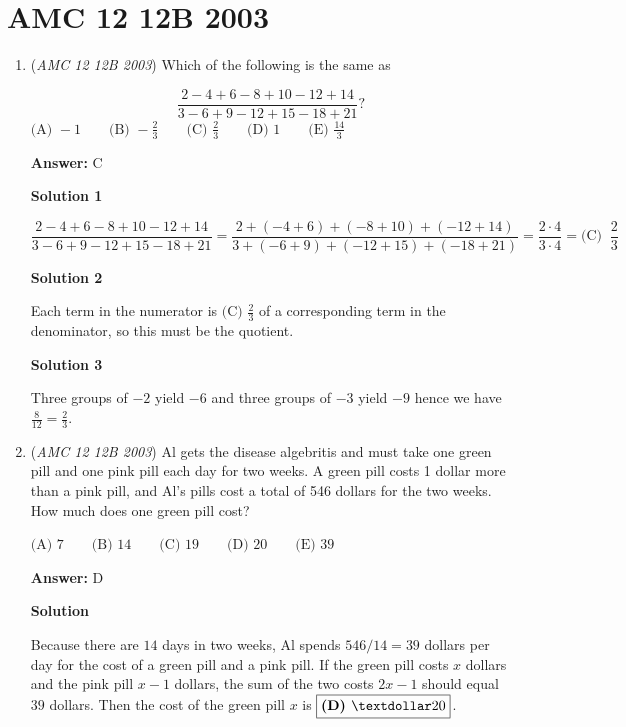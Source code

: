 \section{AMC 12 12B 2003}
        \begin{enumerate}
        	\item (\textit{AMC 12 12B 2003}) Which of the following is the same as


 
 \[\frac{2-4+6-8+10-12+14}{3-6+9-12+15-18+21}?\]
$\text {(A) } -1 \qquad \text {(B) } -\frac{2}{3} \qquad \text {(C) } \frac{2}{3} \qquad \text {(D) } 1 \qquad \text {(E) } \frac{14}{3}$

 \textbf{Answer: }C



\textbf{Solution 1}


 \[\frac{2-4+6-8+10-12+14}{3-6+9-12+15-18+21}=\frac{2+(-4+6)+(-8+10)+(-12+14)}{3+(-6+9)+(-12+15)+(-18+21)}=\frac{2\cdot4}{3\cdot4}=\boxed{\text {(C) }\ \frac{2}{3}}\]




\textbf{Solution 2}

Each term in the numerator is $\text {(C) } \frac{2}{3}$ of a corresponding term in the denominator, so this must be the quotient.

 



\textbf{Solution 3}

Three groups of $-2$ yield $-6$ and three groups of $-3$ yield $-9$ hence we have $\frac{8}{12} = \boxed{\frac{2}{3}}$.

 


	\item (\textit{AMC 12 12B 2003}) Al gets the disease algebritis and must take one green pill and one pink pill each day for two weeks. A green pill costs 1 dollar more than a pink pill, and Al's pills cost a total of 546 dollars for the two weeks. How much does one green pill cost? 


 $\text {(A) } 7 \qquad \text {(B) } 14 \qquad \text {(C) } 19 \qquad \text {(D) } 20 \qquad \text {(E) } 39$

 \textbf{Answer: }D



\textbf{Solution}

Because there are $14$ days in two weeks, Al spends $546/14 = 39$ dollars per day for the cost of a green pill and a pink pill. If the green pill costs $x$ dollars and the pink pill $x-1$ dollars, the sum of the two costs $2x-1$ should equal $39$ dollars. Then the cost of the green pill $x$ is $\boxed{\textbf{(D) }\textdollar  20}$.


\end{enumerate}
